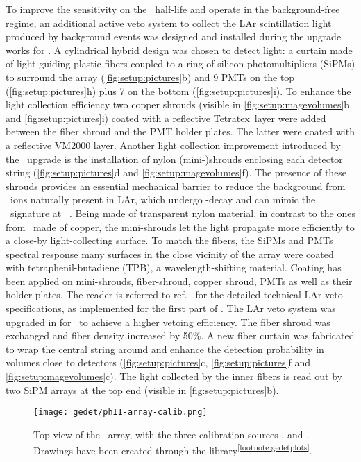 To improve the sensitivity on the \onbb\ half-life and operate in the background-free
regime, an additional active veto system to collect the LAr scintillation light produced
by background events was designed and installed during the upgrade works for \phasetwo. A
cylindrical hybrid design was chosen to detect light: a curtain made of
light-guiding plastic fibers coupled to a ring of silicon photomultipliers (SiPMs) to
surround the array (\cref{fig:setup:pictures}b) and 9 PMTs on the top
(\cref{fig:setup:pictures}h) plus 7 on the bottom (\cref{fig:setup:pictures}i). To enhance
the light collection efficiency two copper shrouds (visible in
\cref{fig:setup:magevolumes}b and \cref{fig:setup:pictures}i) coated with a reflective
Tetratex\reg\ layer were added between the fiber shroud and the PMT holder plates. The
latter were coated with a reflective VM2000 layer. Another light collection improvement
introduced by the \phasetwo\ upgrade is the installation of nylon (mini-)shrouds enclosing
each detector string (\cref{fig:setup:pictures}d and \cref{fig:setup:magevolumes}f). The
presence of these shrouds provides an essential mechanical barrier to reduce the
background from \kvz\ ions naturally present in LAr, which undergo \b-decay and can mimic
the \onbb\ signature at \qbb~\cite{Lubashevskiy2017}.  Being made of transparent nylon
material, in contrast to the ones from \phaseone\ made of copper, the mini-shrouds let the
light propagate more efficiently to a close-by light-collecting surface. To match the
fibers, the SiPMs and PMTs spectral response many surfaces in the close vicinity of the
array were coated with tetraphenil-butadiene (TPB), a wavelength-shifting material.
Coating has been applied on mini-shrouds, fiber-shroud, copper shroud, PMTs as well as
their holder plates. The reader is referred to ref.~\cite{Agostini2018a} for the detailed
technical LAr veto specifications, as implemented for the first part of \phasetwo.
\newpar
The LAr veto system was upgraded in  for \phasetwop\ to achieve a higher vetoing
efficiency. The fiber shroud was exchanged and fiber density increased by 50\%. A new
fiber curtain was fabricated to wrap the central string around and enhance the detection
probability in volumes close to detectors (\cref{fig:setup:pictures}c,
\cref{fig:setup:pictures}f and \cref{fig:setup:magevolumes}c). The light collected by the
inner fibers is read out by two SiPM arrays at the top end (visible in
\cref{fig:setup:pictures}b).

\begin{figure}
  \centering
  \texttt{[image: gedet/phII-array-calib.png]}
  \caption{%
    Top view of the \phasetwo\ array, with the three calibration sources , 
    and . Drawings have been created through the 
    library\textsuperscript{\ref{footnote:gedetplots}}.
  }\label{fig:setup:calib-pos}
\end{figure}

